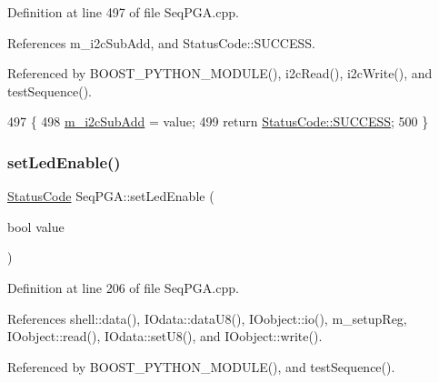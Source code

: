 Definition at line 497 of file Seq\+P\+G\+A.\+cpp.



References m\+\_\+i2c\+Sub\+Add, and Status\+Code\+::\+S\+U\+C\+C\+E\+SS.



Referenced by B\+O\+O\+S\+T\+\_\+\+P\+Y\+T\+H\+O\+N\+\_\+\+M\+O\+D\+U\+L\+E(), i2c\+Read(), i2c\+Write(), and test\+Sequence().


\begin{DoxyCode}
497                                                         \{
498   \hyperlink{classSeqPGA_a82bda98edb9681aff47733e83ac8bc4f}{m\_i2cSubAdd} = value;
499   \textcolor{keywordflow}{return} \hyperlink{classStatusCode_a6f565cbeadc76d14c72f047e5e85eb4badd0da38d3ba0d922efd1f4619bc37ad8}{StatusCode::SUCCESS};
500 \}
\end{DoxyCode}
\mbox{\label{classSeqPGA_a2e256a39e1bc4fbfa23de3760a7bd19a}} 
\subsubsection{\texorpdfstring{set\+Led\+Enable()}{setLedEnable()}}
{\footnotesize\ttfamily \hyperlink{classStatusCode}{Status\+Code} Seq\+P\+G\+A\+::set\+Led\+Enable (\begin{DoxyParamCaption}\item[{bool}]{value }\end{DoxyParamCaption})}



Definition at line 206 of file Seq\+P\+G\+A.\+cpp.



References shell\+::data(), I\+Odata\+::data\+U8(), I\+Oobject\+::io(), m\+\_\+setup\+Reg, I\+Oobject\+::read(), I\+Odata\+::set\+U8(), and I\+Oobject\+::write().



Referenced by B\+O\+O\+S\+T\+\_\+\+P\+Y\+T\+H\+O\+N\+\_\+\+M\+O\+D\+U\+L\+E(), and test\+Sequence().


